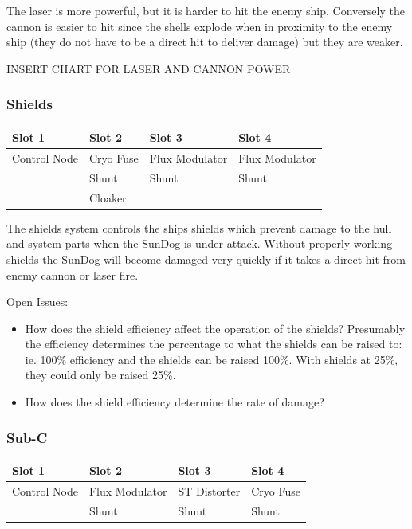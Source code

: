 \begin{itemize}
The laser is more powerful, but it is harder to hit the enemy ship. Conversely the cannon is easier to hit since the shells explode when in proximity to the enemy ship (they do not have to be a direct hit to deliver damage) but they are weaker. 


INSERT CHART FOR LASER AND CANNON POWER


\subsubsection{Shields}

\begin{tabular}{ | p{2.5cm} | p{2.5cm} | p{2.5cm} | p{2.5cm} | }
\hline
Slot 1 & Slot 2 & Slot 3 & Slot 4 \\ \hline
Control Node & Cryo Fuse & Flux Modulator & Flux Modulator \\
& Shunt & Shunt & Shunt \\
& Cloaker & & \\
\hline
\end{tabular}

The shields system controls the ships shields which prevent damage to
the hull and system parts when the SunDog is under attack.  Without
properly working shields the SunDog will become damaged very quickly
if it takes a direct hit from enemy cannon or laser fire.

Open Issues:
\begin{itemize}
\item How does the shield efficiency affect the operation of the shields?
Presumably the efficiency determines the percentage to what the shields can
be raised to:  ie. 100\% efficiency and the shields can be raised 100\%.
With shields at 25\%, they could only be raised 25\%.
\item How does the shield efficiency determine the rate of damage?
\end{itemize}

\subsubsection{Sub-C}

\begin{tabular}{ | p{2.5cm} | p{2.5cm} | p{2.5cm} | p{2.5cm} | }
\hline
Slot 1 & Slot 2 & Slot 3 & Slot 4 \\ \hline
Control Node & Flux Modulator & ST Distorter & Cryo Fuse\\
& Shunt & Shunt & Shunt \\
\hline
\end{tabular}


\end{itemize}

